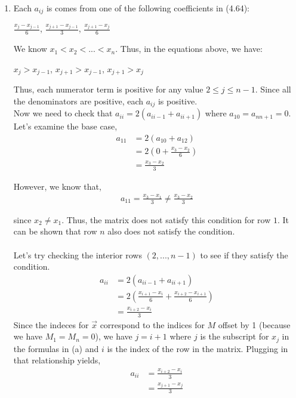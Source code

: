 \documentclass[12pt]{article}
\begin{document}
\begin{enumerate}[\alph*)]
\item Each $a_{ij}$ is comes from one of the following coefficients in (4.64):
\begin{center}
$\frac{x_j - x_{j-1}}{6}$, $\frac{x_{j+1} - x_{j-1}}{3}$, $\frac{x_{j+1} - x_j}{6}$
\end{center}

We know $x_1 < x_2 < ... < x_n$. Thus, in the equations above, we have:
\begin{center}
$x_j > x_{j-1}$, $x_{j+1} > x_{j-1}$, $x_{j+1} > x_j$
\end{center}

Thus, each numerator term is positive for any value $2 \leq j \leq n-1$. Since all the denominators are positive, each $a_{ij}$ is positive.\\

Now we need to check that $a_{ii} = 2(a_{ii-1} + a_{ii+1})$ where $a_{10} = a_{nn+1} = 0$.\\

Let's examine the base case,
\begin{align*}
a_{11} &= 2\left(a_{10} + a_{12}\right)\\
&= 2\left(0 + \frac{x_3 - x_2}{6}\right)\\
&= \frac{x_3 - x_2}{3}
\end{align*} 

However, we know that,
\begin{align*}
a_{11} = \frac{x_3 - x_1}{3} \neq \frac{x_3 - x_2}{3}
\end{align*}

since $x_2 \neq x_1$. Thus, the matrix does not satisfy this condition for row $1$. It can be shown that row $n$ also does not satisfy the condition.\\
\\
Let's try checking the interior rows $(2,...,n-1)$ to see if they satisfy the condition.
\begin{align*}
a_{ii} &= 2\left(a_{ii-1} + a_{ii+1}\right)\\
&= 2\left(\frac{x_{i+1} - x_{i}}{6} + \frac{x_{i+2} - x_{i+1}}{6}\right)\\
&= \frac{x_{i+2} - x_{i}}{3}
\end{align*}
Since the indeces for $\vec{x}$ correspond to the indices for $M$ offset by 1 (because we have $M_1 = M_n = 0$), we have $j = i+1$ where $j$ is the subscript for $x_j$ in the formulas in (a) and $i$ is the index of the row in the matrix. Plugging in that relationship yields,
\begin{align*}
a_{ii} &= \frac{x_{i+2} - x_{i}}{3}\\
&= \frac{x_{j+1} - x_{j}}{3}
\end{align*}


\end{enumerate}
\end{document}
